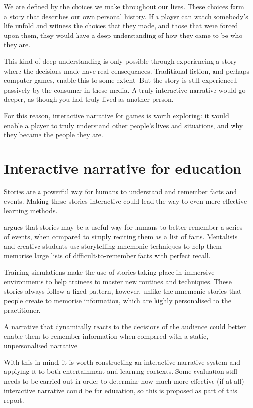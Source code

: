 \documentclass[11pt]{report}
\begin{document}
We are defined by the choices we make throughout our lives. These choices form a story that describes our own personal history. If a player can watch somebody's life unfold and witness the choices that they made, and those that were forced upon them, they would have a deep understanding of how they came to be who they are.

This kind of deep understanding is only possible through experiencing a story where the decisions made have real consequences. Traditional fiction, and perhaps computer games, enable this to some extent. But the story is still experienced passively by the consumer in these media. A truly interactive narrative would go deeper, as though you had truly lived as another person.

For this reason, interactive narrative for games is worth exploring: it would
enable a player to truly understand other people's lives and situations, and why they became the people they are.


\section{Interactive narrative for education}
Stories are a powerful way for humans to understand and remember facts and events. Making these stories interactive could lead the way to even more effective learning methods.

\citet{schank1990tell} argues that stories may be a useful way for humans to better remember a series of events, when compared to simply reciting them as a list of facts. Mentalists and creative students use storytelling mnemonic techniques to help them memorise large lists of difficult-to-remember facts with perfect recall.

Training simulations make the use of stories taking place in immersive environments to help trainees to master new routines and techniques. These stories always follow a fixed pattern, however, unlike the mnemonic stories that people create to memorise information, which are highly personalised to the practitioner.

A narrative that dynamically reacts to the decisions of the audience could better enable them to remember information when compared with a static, unpersonalised narrative.

With this in mind, it is worth constructing an interactive narrative system and applying it to both entertainment and learning contexts. Some evaluation still needs to be carried out in order to determine how much more effective (if at all) interactive narrative could be for education, so this is proposed as part of this report.
\end{document}
